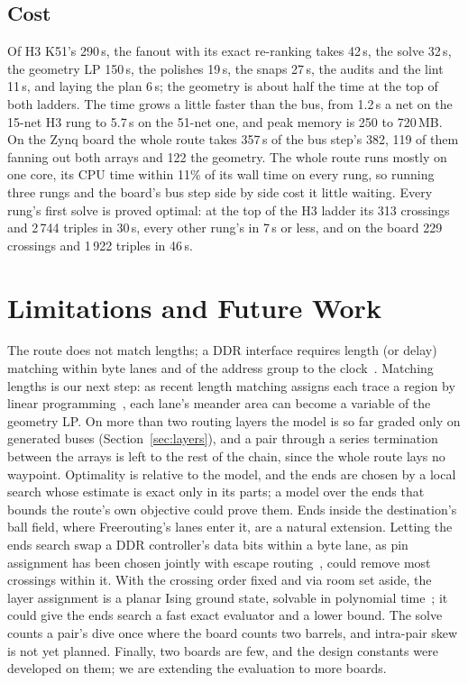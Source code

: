 \documentclass[journal]{IEEEtran}
\begin{document}
\subsection{Cost}
\label{sec:cost}
Of H3 K51's 290\,s, the fanout with its exact re-ranking takes 42\,s, the solve 32\,s, the geometry LP 150\,s, the polishes 19\,s, the snaps 27\,s, the audits and the lint 11\,s, and laying the plan 6\,s; the geometry is about half the time at the top of both ladders. The time grows a little faster than the bus, from 1.2\,s a net on the 15-net H3 rung to 5.7\,s on the 51-net one, and peak memory is 250 to 720\,MB. On the Zynq board the whole route takes 357\,s of the bus step's 382, 119 of them fanning out both arrays and 122 the geometry. The whole route runs mostly on one core, its CPU time within 11\% of its wall time on every rung, so running three rungs and the board's bus step side by side cost it little waiting. Every rung's first solve is proved optimal: at the top of the H3 ladder its 313 crossings and 2\,744 triples in 30\,s, every other rung's in 7\,s or less, and on the board 229 crossings and 1\,922 triples in 46\,s.

\section{Limitations and Future Work}
\label{sec:limits}
The route does not match lengths; a DDR interface requires length (or delay) matching within byte lanes and of the address group to the clock~\cite{ozdal2006length}. Matching lengths is our next step: as recent length matching assigns each trace a region by linear programming~\cite{lin2026,fang2024}, each lane's meander area can become a variable of the geometry LP. On more than two routing layers the model is so far graded only on generated buses (Section~\ref{sec:layers}), and a pair through a series termination between the arrays is left to the rest of the chain, since the whole route lays no waypoint. Optimality is relative to the model, and the ends are chosen by a local search whose estimate is exact only in its parts; a model over the ends that bounds the route's own objective could prove them. Ends inside the destination's ball field, where Freerouting's lanes enter it, are a natural extension. Letting the ends search swap a DDR controller's data bits within a byte lane, as pin assignment has been chosen jointly with escape routing~\cite{leimak2013}, could remove most crossings within it. With the crossing order fixed and via room set aside, the layer assignment is a planar Ising ground state, solvable in polynomial time~\cite{hadlock1975,barahona1982,glass2026}; it could give the ends search a fast exact evaluator and a lower bound. The solve counts a pair's dive once where the board counts two barrels, and intra-pair skew is not yet planned. Finally, two boards are few, and the design constants were developed on them; we are extending the evaluation to more boards.
\end{document}
